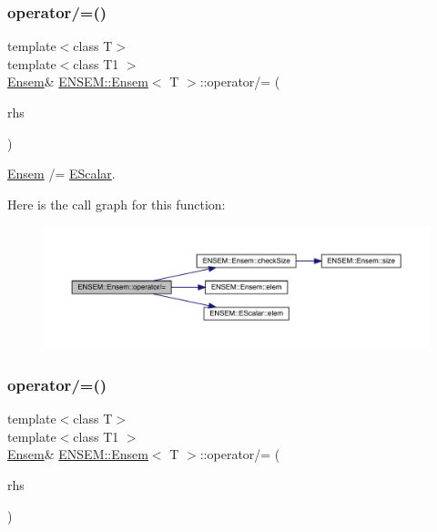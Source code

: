 \subsubsection{\texorpdfstring{operator/=()}{operator/=()}\hspace{0.1cm}{\footnotesize\ttfamily [1/6]}}
{\footnotesize\ttfamily template$<$class T$>$ \\
template$<$class T1 $>$ \\
\mbox{\hyperlink{classENSEM_1_1Ensem}{Ensem}}\& \mbox{\hyperlink{classENSEM_1_1Ensem}{E\+N\+S\+E\+M\+::\+Ensem}}$<$ T $>$\+::operator/= (\begin{DoxyParamCaption}\item[{const \mbox{\hyperlink{classENSEM_1_1EScalar}{E\+Scalar}}$<$ T1 $>$ \&}]{rhs }\end{DoxyParamCaption})\hspace{0.3cm}{\ttfamily [inline]}}



\mbox{\hyperlink{classENSEM_1_1Ensem}{Ensem}} /= \mbox{\hyperlink{classENSEM_1_1EScalar}{E\+Scalar}}. 

Here is the call graph for this function\+:
\nopagebreak
\begin{figure}[H]
\begin{center}
\leavevmode
\includegraphics[width=350pt]{d7/d3e/classENSEM_1_1Ensem_a32bf70c0844ce98695151457bf9df018_cgraph}
\end{center}
\end{figure}
\mbox{\label{classENSEM_1_1Ensem_a32bf70c0844ce98695151457bf9df018}} 
\subsubsection{\texorpdfstring{operator/=()}{operator/=()}\hspace{0.1cm}{\footnotesize\ttfamily [2/6]}}
{\footnotesize\ttfamily template$<$class T$>$ \\
template$<$class T1 $>$ \\
\mbox{\hyperlink{classENSEM_1_1Ensem}{Ensem}}\& \mbox{\hyperlink{classENSEM_1_1Ensem}{E\+N\+S\+E\+M\+::\+Ensem}}$<$ T $>$\+::operator/= (\begin{DoxyParamCaption}\item[{const \mbox{\hyperlink{classENSEM_1_1EScalar}{E\+Scalar}}$<$ T1 $>$ \&}]{rhs }\end{DoxyParamCaption})\hspace{0.3cm}{\ttfamily [inline]}}



